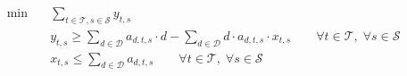 \begin{align}
  \min\quad & \sum_{t \in \mathcal{T}, s \in \mathcal{S}} y_{t,s} \tag{total_delay} \\
  & y_{t,s} \ge \sum_{d \in \mathcal{D}} a_{d,t,s} \cdot d - \sum_{d \in \mathcal{D}} d \cdot a_{d,t,s} \cdot x_{t,s} \qquad \forall t \in \mathcal{T},\; \forall s \in \mathcal{S} \tag{delay} \\
  & x_{t,s} \le \sum_{d \in \mathcal{D}} a_{d,t,s} \qquad \forall t \in \mathcal{T},\; \forall s \in \mathcal{S} \tag{short_turn} \\
\end{align}